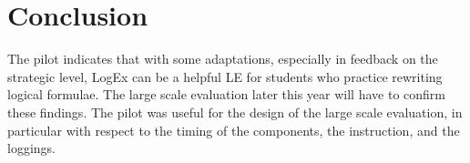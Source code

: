 \documentclass[a4paper,UKenglish]{lipics}
\begin{document}
\section{Conclusion}
The pilot indicates that with some adaptations, especially in feedback on the
strategic level, LogEx can be a helpful LE for students who practice rewriting
logical formulae. The large scale evaluation later this year will have to
confirm these findings. The pilot was useful for the design of the large scale
evaluation, in particular with respect to the timing of the components, the
instruction, and the loggings.



\end{document}
